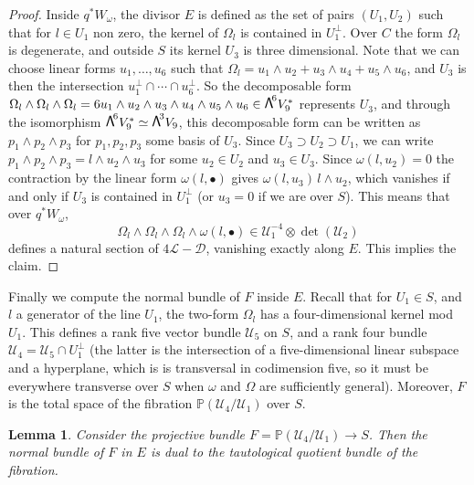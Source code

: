 \documentclass[JEP,XML,SOM,Unicode,NoEqCountersInSection]{cedram}
\newcommand{\sbullet}{{\scriptstyle\bullet}}
\newcommand\bw[1]{{\hbox{\large$\mathsf{\Lambda}$}^{\!#1}}}
\let\mathcal\mathscr
\theoremstyle{plain}
\newtheorem{lemma}[theorem]{Lemma}
\theoremstyle{definition}
\newcommand{\PP}{\mathbb{P}}
\newcommand{\sheaf}[1]{\mathcal{#1}}
\newcommand{\kd}{\sheaf{D}}
\newcommand{\kl}{\sheaf{L}}
\newcommand{\ku}{\sheaf{U}}
\begin{document}
\begin{proof}
Inside $q^*W_\omega$, the divisor $E$ is defined as the set of pairs $(U_1,U_2)$ such that
for $l\in U_1$ non zero, the kernel
of $\Omega_l$ is contained in $U_1^\perp$. Over $C$ the form $\Omega_l$ is degenerate, and outside
$S$ its kernel $U_3$ is three dimensional. Note that we can choose linear forms $u_1,\ldots ,u_6$
such that $\Omega_l=u_1\wedge u_2+u_3\wedge u_4+u_5\wedge u_6$, and $U_3$ is then the intersection $u_1^\perp\cap\cdots \cap u_6^\perp$. So the decomposable form $\Omega_l\wedge \Omega_l\wedge \Omega_l = 6u_1\wedge u_2\wedge u_3\wedge u_4\wedge u_5\wedge u_6\in\bw6V_9^*$ represents $U_3$, and
through the isomorphism $\bw6V_9^*\simeq \bw3V_9$, this decomposable
form can be written as $p_1\wedge p_2\wedge p_3$ for $p_1, p_2, p_3$ some basis of $U_3$.
Since $U_3\supset U_2\supset U_1$, we can write
$p_1\wedge p_2\wedge p_3=l\wedge u_2\wedge u_3$ for some $u_2\in U_2$ and $u_3\in U_3$. Since $\omega(l,u_2)=0$ the contraction
by the linear form $\omega(l,\sbullet)$ gives $\omega(l,u_3)\, l\wedge u_2$, which vanishes if
and only if $U_3$ is contained in $U_1^\perp$ (or $u_3=0$ if we are over $S$).
This means that over $q^*W_\omega$,
\[
\Omega_l\wedge \Omega_l\wedge \Omega_l\wedge\omega(l,\sbullet)\in \ku_1^{-4}\otimes \det(\ku_2)
\] defines a natural section of $4\kl-\kd$, vanishing exactly along $E$.
This implies the claim.
\end{proof}

Finally we compute the normal bundle of $F$ inside $E$. Recall that for $U_1\in S$, and~$l$ a generator of the line $U_1$, the two-form $\Omega_l$ has a four-dimensional kernel mod $U_1$. This defines a rank five vector bundle $\ku_5$ on $S$, and a rank four bundle $\ku_4=\ku_5
\cap U_1^\perp$ (the latter is the intersection of a five-dimensional linear subspace and a hyperplane, which is
is transversal in codimension five, so it must be everywhere transverse over $S$ when $\omega$ and $\Omega $ are sufficiently
general). Moreover, $F$ is the total space of the fibration $\PP (\ku_4/\ku_1)$ over $S$.

\begin{lemma}\label{normalF}
Consider the projective bundle $F=\PP (\ku_4/\ku_1)\to S$. Then
the normal bundle of $F$ in $E$ is dual to the tautological quotient
bundle of the fibration.
\end{lemma}
\end{document}
